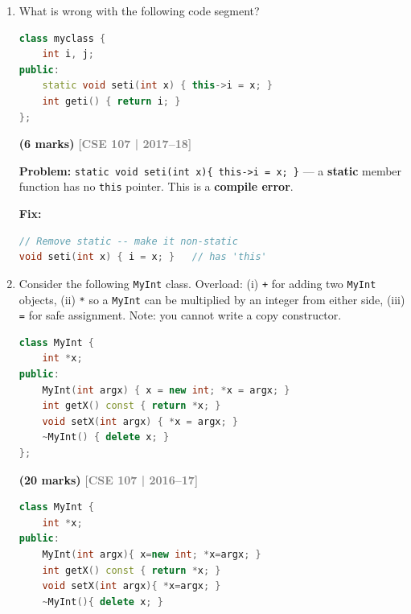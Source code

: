 \documentclass[12pt,a3paper]{article}
\newcommand{\yr}[1]{\hfill\textcolor{gray}{\small\textbf{[#1]}}}
\newcommand{\mk}[1]{\textcolor{orange!70!black}{\small\textbf{(#1 marks)}}}
\begin{document}
\begin{enumerate}
\begin{tcolorbox}
\end{tcolorbox}

\item What is wrong with the following code segment?
\begin{lstlisting}[language=C++]
class myclass {
    int i, j;
public:
    static void seti(int x) { this->i = x; }
    int geti() { return i; }
};
\end{lstlisting}
\mk{6}
\yr{CSE 107 | 2017--18}


\begin{tcolorbox}[enhanced,breakable,ansbox,colback=cF!4,colframe=cF,
  boxrule=0.8pt,arc=5pt,
  title={\textbf{Answer --- Problem with this in static method}},
  fonttitle=\bfseries\color{white},colbacktitle=cF]

\textbf{Problem:} \texttt{static void seti(int x)\{ this->i = x; \}}
--- a \textbf{static} member function has no \texttt{this} pointer.
This is a \textbf{compile error}.

\textbf{Fix:}
\begin{lstlisting}[language=C++]
// Remove static -- make it non-static
void seti(int x) { i = x; }   // has 'this'
\end{lstlisting}

\end{tcolorbox}

\item Consider the following \texttt{MyInt} class. Overload: (i) \texttt{+} for adding two \texttt{MyInt} objects, (ii) \texttt{*} so a \texttt{MyInt} can be multiplied by an integer from either side, (iii) \texttt{=} for safe assignment. Note: you cannot write a copy constructor.
\begin{lstlisting}[language=C++]
class MyInt {
    int *x;
public:
    MyInt(int argx) { x = new int; *x = argx; }
    int getX() const { return *x; }
    void setX(int argx) { *x = argx; }
    ~MyInt() { delete x; }
};
\end{lstlisting}
\mk{20}
\yr{CSE 107 | 2016--17}


\begin{tcolorbox}[enhanced,breakable,ansbox,colback=cF!4,colframe=cF,
  boxrule=0.8pt,arc=5pt,
  title={\textbf{Answer --- MyInt --- overload +, * (both sides), =}},
  fonttitle=\bfseries\color{white},colbacktitle=cF]

\begin{lstlisting}[language=C++]
class MyInt {
    int *x;
public:
    MyInt(int argx){ x=new int; *x=argx; }
    int getX() const { return *x; }
    void setX(int argx){ *x=argx; }
    ~MyInt(){ delete x; }


\end{lstlisting}
\end{tcolorbox}
\end{enumerate}
\end{document}
